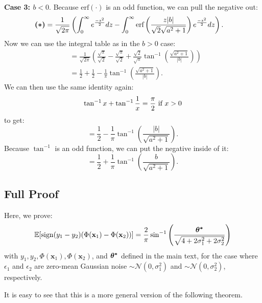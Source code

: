 \documentclass{article} %
\begin{document}
\textbf{Case 3: $b<0$}. Because $\text{erf}(\cdot)$ is an odd function, we can pull the negative out:
\begin{align*}
\textbf{(\textasteriskcentered)} &= \frac{1}{\sqrt{2\pi}}\left(\int_{0}^{\infty} e^{\frac{-z^2}{2}}dz - \int_{0}^{\infty}\text{erf}\left(\frac{z|b|}{\sqrt{2}\sqrt{a^2+1}}\right) e^{\frac{-z^2}{2}} dz\right).
\end{align*}
Now we can use the integral table as in the $b>0$ case:
\begin{align*}
&= \frac{1}{\sqrt{2\pi}}\left(\frac{\sqrt{\pi}}{\sqrt{2}} - \frac{\sqrt{\pi}}{\sqrt{2}} + \frac{\sqrt{2}}{\sqrt{\pi}}\tan^{-1}\left(\frac{\sqrt{a^2+1}}{|b|}\right)\right)\\
&= \frac{1}{2} + \frac{1}{2} - \frac{1}{\pi}\tan^{-1}\left(\frac{\sqrt{a^2+1}}{|b|}\right).
\end{align*}
We can then use the same identity again:
\[
\tan^{-1}x + \tan^{-1}\frac{1}{x} = \frac{\pi}{2}\text{ if } x > 0 \\
\]
to get:
\[
=\frac{1}{2} - \frac{1}{\pi}\tan^{-1}\left(\frac{|b|}{\sqrt{a^2+1}}\right).
\]
Because $\tan^{-1}$ is an odd function, we can put the negative inside of it:
\[
=\frac{1}{2} + \frac{1}{\pi}\tan^{-1}\left(\frac{b}{\sqrt{a^2+1}}\right).
\]

\subsection{Full Proof}

Here, we prove:
\[
\mathbb{E}[\operatorname{sign}(y_1 - y_2) (\Phi(\mathbf{x}_1) - \Phi(\mathbf{x}_2))] = \frac{2}{\pi}\sin^{-1}\left(\frac{\bm{{\bf{\theta}^*}}}{\sqrt{4 + 2\sigma_1^2 + 2\sigma_2^2}}\right)
\]
with $y_1, y_2, \Phi(\mathbf{x}_1), \Phi(\mathbf{x}_2)$, and $\bm{{\bf{\theta}^*}}$ defined in the main text, for the case where $\epsilon_1$ and $\epsilon_2$ are zero-mean Gaussian noise $\sim \mathcal{N}(0,\sigma^2_1)$ and $\sim \mathcal{N}(0,\sigma^2_2)$, respectively.

It is easy to see that this is a more general version of the following theorem.

\estimator*
\end{document}
